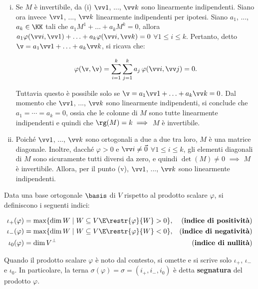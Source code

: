 \documentclass[11pt]{article}
\begin{document}
\begin{solution}
\begin{enumerate}[(i)]
			\item Se $M$ è invertibile, da (i) $\vv1$, ..., $\vv k$ sono linearmente indipendenti. Siano ora
			invece $\vv 1$, ..., $\vv k$ linearmente indipendenti per ipotesi. Siano $a_1$, ..., $a_k \in \KK$ tali
			che $a_1 M^1 + \ldots + a_k M^k = 0$, allora $a_1 \varphi(\vv i, \vv 1) + \ldots + a_k \varphi(\vv i, \vv k) = 0$ $\forall 1 \leq i \leq k$. Pertanto, detto $\v = a_1 \vv 1 + \ldots + a_k \vv k$, si ricava che:
			
			\[ \varphi(\v, \v) = \sum_{i=1}^k \sum_{j=1}^k a_j \, \varphi(\vv i, \vv j) = 0. \]
			
			Tuttavia questo è possibile solo se $\v = a_1 \vv 1 + \ldots + a_k \vv k = 0$. Dal momento che
			$\vv 1$, ..., $\vv k$ sono linearmente indipendenti, si conclude che $a_1 = \cdots = a_k = 0$, ossia
			che le colonne di $M$ sono tutte linearmente indipendenti e quindi che $\rg(M) = k \implies$ $M$ è invertibile.
			
			\item Poiché $\vv 1$, ..., $\vv k$ sono ortogonali a due a due tra loro, $M$ è una matrice diagonale.
			Inoltre, dacché $\varphi > 0$ e $\vv i \neq \vec 0$ $\forall 1 \leq i \leq k$, gli elementi diagonali di $M$ sono sicuramente tutti diversi da zero, e quindi $\det (M) \neq 0$ $\implies$ $M$ è invertibile. Allora,
			per il punto (v), $\vv 1$, ..., $\vv k$ sono linearmente indipendenti.
		\end{enumerate}
	\end{solution}

	\begin{definition}
		Data una base ortogonale $\basis$ di $V$ rispetto al prodotto
		scalare $\varphi$,
		si definiscono i seguenti indici:
		
		\begin{align*}
			\iota_+(\varphi) &= \max\{ \dim W \mid W \subseteq V \E \restr{\varphi}{W} > 0 \}, &\text{(}\textbf{indice di positività}\text{)} \\
			\iota_-(\varphi) &= \max\{ \dim W \mid W \subseteq V \E \restr{\varphi}{W} < 0 \}, &\text{(}\textbf{indice di negatività}\text{)}\\
			\iota_0(\varphi) &= \dim V^\perp &\text{(}\textbf{indice di nullità}\text{)}
		\end{align*}
	
		Quando il prodotto scalare $\varphi$ è noto dal contesto, si omette
		e si scrive solo $\iota_+$, $\iota_-$ e $\iota_0$. In particolare,
		la terna $\sigma(\varphi) = \sigma = (i_+, i_-, i_0)$ è detta \textbf{segnatura} del
		prodotto $\varphi$.
	\end{definition}
	
\end{document}
